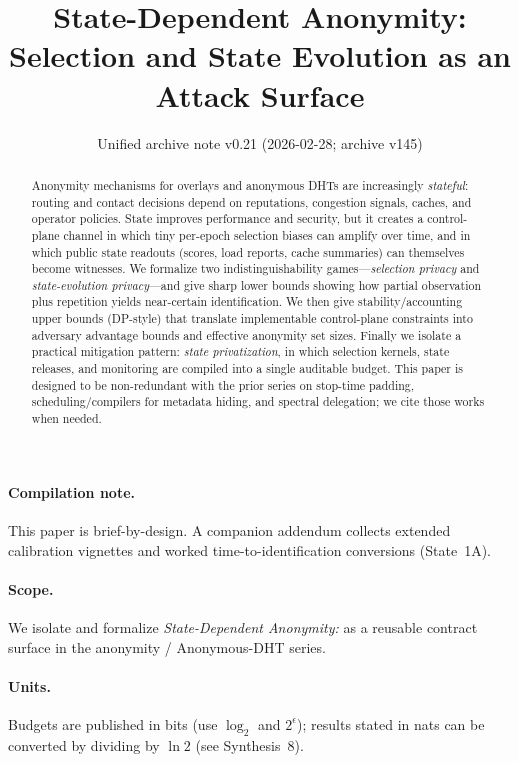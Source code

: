 \documentclass[11pt]{article}
\title{State-Dependent Anonymity:\\Selection and State Evolution as an Attack Surface}
\author{}
\date{Unified archive note v0.21 (2026-02-28; archive v145)}
\begin{document}
\maketitle

\begin{abstract}
Anonymity mechanisms for overlays and anonymous DHTs are increasingly \emph{stateful}:
routing and contact decisions depend on reputations, congestion signals, caches, and operator policies.
State improves performance and security, but it creates a control-plane channel in which tiny per-epoch
selection biases can amplify over time, and in which public state readouts (scores, load reports, cache
summaries) can themselves become witnesses.
We formalize two indistinguishability games---\emph{selection privacy} and \emph{state-evolution privacy}---and give sharp lower bounds
showing how partial observation plus repetition yields near-certain identification.
We then give stability/accounting upper bounds (DP-style) that translate implementable control-plane
constraints into adversary advantage bounds and effective anonymity set sizes.
Finally we isolate a practical mitigation pattern: \emph{state privatization}, in which
selection kernels, state releases, and monitoring are compiled into a single auditable budget.
This paper is designed to be non-redundant with the prior series on stop-time padding,
scheduling/compilers for metadata hiding, and spectral delegation; we cite those works when needed.
\end{abstract}

\paragraph{Compilation note.}
This paper is brief-by-design. A companion addendum collects extended calibration vignettes and worked time-to-identification conversions (State~1A).\cite{series:state1addendum}

\paragraph{Scope.}
We isolate and formalize \emph{State-Dependent Anonymity:} as a reusable contract surface in the anonymity / Anonymous-DHT series.

\paragraph{Units.} Budgets are published in bits (use $\log_2$ and $2^{\epsilon}$); results stated in nats can be converted by dividing by $\ln 2$ (see Synthesis~8).\cite{series:notation}
\end{document}
